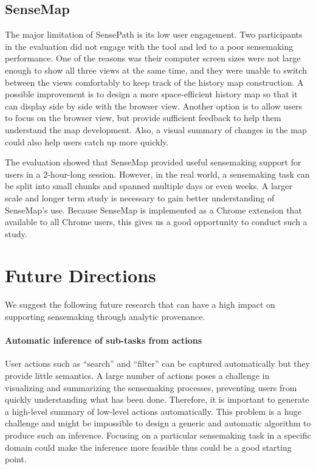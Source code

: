 \subsection{SenseMap}
The major limitation of SensePath is its low user engagement. Two participants in the evaluation did not engage with the tool and led to a poor sensemaking performance. One of the reasons was their computer screen sizes were not large enough to show all three views at the same time, and they were unable to switch between the views comfortably to keep track of the history map construction. A possible improvement is to design a more space-efficient history map so that it can display side by side with the browser view. Another option is to allow users to focus on the browser view, but provide sufficient feedback to help them understand the map development. Also, a visual summary of changes in the map could also help users catch up more quickly.

The evaluation showed that SenseMap provided useful sensemaking support for users in a 2-hour-long session. However, in the real world, a sensemaking task can be split into small chunks and spanned multiple days or even weeks. A larger scale and longer term study is necessary to gain better understanding of SenseMap's use. Because SenseMap is implemented as a Chrome extension that available to all Chrome users, this gives us a good opportunity to conduct such a study.

\section{Future Directions}
We suggest the following future research that can have a high impact on supporting sensemaking through analytic provenance.

\paragraph{Automatic inference of sub-tasks from actions}
User actions such as ``search'' and ``filter'' can be captured automatically but they provide little semantics. A large number of actions poses a challenge in visualizing and summarizing the sensemaking processes, preventing users from quickly understanding what has been done. Therefore, it is important to generate a high-level summary of low-level actions automatically. This problem is a huge challenge and might be impossible to design a generic and automatic algorithm to produce such an inference. Focusing on a particular sensemaking task in a specific domain could make the inference more feasible thus could be a good starting point.

